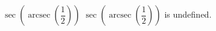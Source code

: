  {$\sec\left(\operatorname{arcsec}\left(\dfrac{1}{2}\right)\right)$}
{ $\sec\left(\operatorname{arcsec}\left(\dfrac{1}{2}\right)\right)$ is undefined.}
